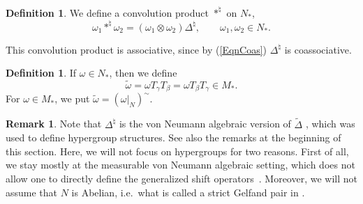 \documentclass[11pt]{article}
\numberwithin{equation}{section}
\theoremstyle{definition}
\newtheorem{dfn}[thm]{Definition}
\newtheorem{rmk}[thm]{Remark}
\begin{document}
\begin{dfn}
 We def\/ine a convolution product $\ast^\natural$ on $N_\ast$,
\[
\omega_1 \ast^\natural \omega_2 = (\omega_1 \otimes \omega_2) \Delta^\natural, \qquad  \omega_1, \omega_2 \in N_\ast.
\]
\end{dfn}

This convolution product is associative, since by (\ref{EqnCoas}) $\Delta^\natural$ is coassociative.

\begin{dfn}
If $\omega \in N_\ast$, then we def\/ine
\[
\tilde{\omega} = \omega T_\gamma  T_\beta = \omega T_\beta T_\gamma \in M_\ast.
\]
 For $\omega \in M_\ast$, we put $\tilde{\omega} = (\omega \vert_N)^\sim$.
\end{dfn}


\begin{rmk}
Note that $\Delta^\natural$ is the von Neumann algebraic version of $\tilde{\Delta}$ \cite{VaiHyp}, which was used to def\/ine hypergroup structures. See also the remarks at the beginning of this section. Here, we will not focus on hypergroups for two reasons. First of all, we stay mostly at the measurable von Neumann algebraic setting, which does not allow one to directly def\/ine the generalized shift operators~\cite{VaiHyp}. Moreover, we will not assume that $N$ is Abelian, i.e.\ what is called a strict Gelfand pair in \cite{VaiHyp}.
\end{rmk}
\end{document}

